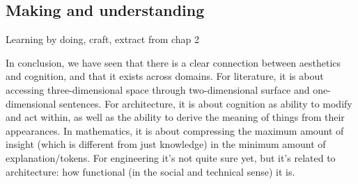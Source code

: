 \subsection{Making and understanding}
\label{subsec:aesthetic-engineering}


Learning by doing, craft, extract from chap 2

\spacer

In conclusion, we have seen that there is a clear connection between aesthetics and cognition, and that it exists across domains. For literature, it is about accessing three-dimensional space through two-dimensional surface and one-dimensional sentences. For architecture, it is about cognition as ability to modify and act within, as well as the ability to derive the meaning of things from their appearances. In mathematics, it is about compressing the maximum amount of insight (which is different from just knowledge) in the minimum amount of explanation/tokens. For engineering it's not quite sure yet, but it's related to architecture: how functional (in the social and technical sense) it is.